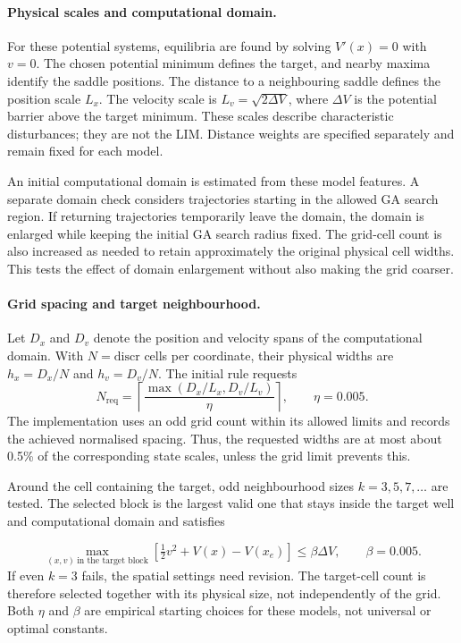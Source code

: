 \begin{revision}
\paragraph{Physical scales and computational domain.}
For these potential systems, equilibria are found by solving $V'(x)=0$ with $v=0$. The chosen potential minimum defines the target, and nearby maxima identify the saddle positions. The distance to a neighbouring saddle defines the position scale $L_x$. The velocity scale is $L_v=\sqrt{2\Delta V}$, where $\Delta V$ is the potential barrier above the target minimum. These scales describe characteristic disturbances; they are not the LIM. Distance weights are specified separately and remain fixed for each model.
\end{revision}

\begin{revision}
An initial computational domain is estimated from these model features. A separate domain check considers trajectories starting in the allowed GA search region. If returning trajectories temporarily leave the domain, the domain is enlarged while keeping the initial GA search radius fixed. The grid-cell count is also increased as needed to retain approximately the original physical cell widths. This tests the effect of domain enlargement without also making the grid coarser.
\end{revision}

\paragraph{Grid spacing and target neighbourhood.}
Let $D_x$ and $D_v$ denote the position and velocity spans of the computational domain. With $N=\mathrm{discr}$ cells per coordinate, their physical widths are $h_x=D_x/N$ and $h_v=D_v/N$. The initial rule requests
\[
 N_{\mathrm{req}}=\left\lceil\frac{\max(D_x/L_x,D_v/L_v)}{\eta}\right\rceil,
 \qquad \eta=0.005.
\]
The implementation uses an odd grid count within its allowed limits and records the achieved normalised spacing. Thus, the requested widths are at most about 0.5\% of the corresponding state scales, unless the grid limit prevents this.

\begin{revision}
Around the cell containing the target, odd neighbourhood sizes $k=3,5,7,\ldots$ are tested. The selected block is the largest valid one that stays inside the target well and computational domain and satisfies
\end{revision}
\[
 \max_{(x,v)\ \text{in the target block}}
 \left[\tfrac12 v^2+V(x)-V(x_e)\right]\leq\beta\Delta V,
 \qquad \beta=0.005.
\]
If even $k=3$ fails, the spatial settings need revision. The target-cell count is therefore selected together with its physical size, not independently of the grid. Both $\eta$ and $\beta$ are empirical starting choices for these models, not universal or optimal constants.

